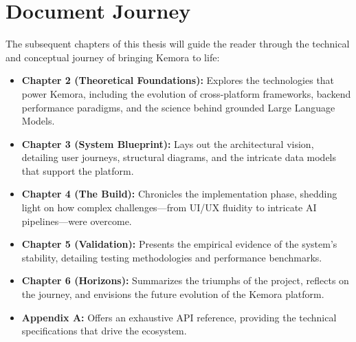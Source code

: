 \section{Document Journey}
The subsequent chapters of this thesis will guide the reader through the technical and conceptual journey of bringing Kemora to life:
\begin{itemize}
    \item \textbf{Chapter 2 (Theoretical Foundations):} Explores the technologies that power Kemora, including the evolution of cross-platform frameworks, backend performance paradigms, and the science behind grounded Large Language Models.
    \item \textbf{Chapter 3 (System Blueprint):} Lays out the architectural vision, detailing user journeys, structural diagrams, and the intricate data models that support the platform.
    \item \textbf{Chapter 4 (The Build):} Chronicles the implementation phase, shedding light on how complex challenges---from UI/UX fluidity to intricate AI pipelines---were overcome.
    \item \textbf{Chapter 5 (Validation):} Presents the empirical evidence of the system’s stability, detailing testing methodologies and performance benchmarks.
    \item \textbf{Chapter 6 (Horizons):} Summarizes the triumphs of the project, reflects on the journey, and envisions the future evolution of the Kemora platform.
    \item \textbf{Appendix A:} Offers an exhaustive API reference, providing the technical specifications that drive the ecosystem.
\end{itemize}
